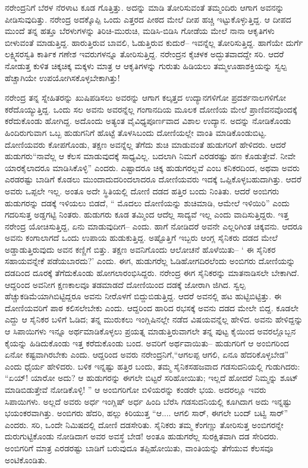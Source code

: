 ನರೇಂದ್ರನಿಗೆ ಬೆರಳ ನೆರಳಾಟ  ಕೂಡ ಗೊತ್ತಿತ್ತು. ಅದನ್ನು ಮಾಡಿ ತೋರಿಸುವಂತೆ ತಮ್ಮಂದಿರು ಆಗಾಗ ಅವನನ್ನು ಪೀಡಿಸುವುದಿತ್ತು. ನರೇಂದ್ರ ಅದಕ್ಕೊಪ್ಪಿ ಒಂದು ಎತ್ತರದ ಪೀಠದ ಮೇಲೆ ದೀಪ ಹಚ್ಚಿ ಇಟ್ಟುಕೊಳ್ಳುತ್ತಿದ್ದ. ಆ ದೀಪದ ಮುಂದೆ ತನ್ನ ಹತ್ತೂ ಬೆರಳುಗಳನ್ನು ತಿರಿಚಿ-ಮುರುಚಿ, ಮಡಿಸಿ-ಬಿಡಿಸಿ ಗೋಡೆಯ ಮೇಲೆ ನಾನಾ ಆಕೃತಿಗಳು ಬೀಳುವಂತೆ ಮಾಡುತ್ತಿದ್ದ. ಹಾರುತ್ತಿರುವ ಬಾವಲಿ, ಓಡುತ್ತಿರುವ ಕುದುರೆ– ಇವನ್ನೆಲ್ಲ ತೋರಿಸುತ್ತಿದ್ದ. ಹಾಗೆಯೇ ದುರ್ಗೆ ಲಕ್ಷ್ಮಿಸರಸ್ವತಿ ಕಾರ್ತಿಕ ಗಣೇಶ ಇವರುಗಳನ್ನೂ ತೋರಿಸುತ್ತಿದ್ದ. ನರೇಂದ್ರನ ಕೈಚಳಕ ಅದ್ಭುತವಾದದ್ದೇ ಸರಿ. ಆದರೆ ನೋಡುತ್ತ ಕುಳಿತ ಚಿಕ್ಕಚಿಕ್ಕ ಮಕ್ಕಳು ಮಾತ್ರ ಆ ಆಕೃತಿಗಳನ್ನು ಗುರುತು ಹಿಡಿಯಲು ತಮ್ಮಊಹಾಶಕ್ತಿಯನ್ನು ಸ್ವಲ್ಪ ಹೆಚ್ಚಾಗಿಯೇ ಉಪಯೋಗಿಸಕೊಳ್ಳಬೇಕಾಗಿತ್ತು!

ನರೇಂದ್ರ ತನ್ನ ಸ್ನೇಹಿತರನ್ನು ಖುಷಿಪಡಿಸಲು ಅವರನ್ನು ಆಗಾಗ ಕಲ್ಕತ್ತದ ಉದ್ಯಾನಗಳಿಗೋ ಪ್ರದರ್ಶನಾಲಗಳಿಗೋ ಕರೆದೊಯ್ಯುತ್ತಿದ್ದ. ಒಂದು ಸಲ ಅವನು ಅವರನ್ನೆಲ್ಲ ಗಂಗಾನದಿಯ ಮೂಲಕ ದೋಣಿಯ ಮೇಲೆ ಪ್ರಾಣಿವನವೊಂದಕ್ಕೆ ಕರೆದುಕೊಂಡು ಹೋಗಿದ್ದ. ಅದೊಂದು ಅತ್ಯಂತ ವೈವಿಧ್ಯಪೂರ್ಣವಾದ ವಿಶಾಲ ಉದ್ಯಾನ. ಅದನ್ನು ನೋಡಿಕೊಂಡು ಹಿಂದಿರುಗುವಾಗ ಒಬ್ಬ ಹುಡುಗನಿಗೆ ಹೊಟ್ಟೆ ತೊಳಸಿಬಂದು ದೋಣಿಯಲ್ಲೇ ವಾಂತಿ ಮಾಡಿಕೊಂಡುಬಿಟ್ಟ. ದೋಣಿಯವರು ಕೋಪಗೊಂಡು, ತಕ್ಷಣ ಅವನ್ನೆಲ್ಲ ತೆಗೆದು ಶುಚಿ ಮಾಡುವಂತೆ ಹುಡುಗರಿಗೆ ಹೇಳಿದರು. ಆದರೆ ಹುಡುಗರು“ನಾವೆಲ್ಲ ಆ ಕೆಲಸ ಮಾಡುವುದಕ್ಕೆ ಸಾಧ್ಯವಿಲ್ಲ. ಬದಲಾಗಿ ನಿಮಗೆ ಎರಡರಷ್ಟು ಹಣ ಕೊಡುತ್ತೇವೆ. ನೀವೇ ಯಾರಕೈಲಾದರೂ ಮಾಡಿಸಿಕೊಳ್ಳಿ” ಎಂದರು. ಎಷ್ಟಾದರೂ ಚಿಕ್ಕ ಹುಡುಗರಲ್ಲವೆ ಎಂಬ ಕನಿಕರದಿಂದ, ಅಥವಾ ಅವರು ಎರಡರಷ್ಟು ಬಾಡಿಗೆ ಕೊಡಲು ಮುಂದಾದುದರಿಂದಲಾದರೂ ದೋಣಿಯವರು ಇದಕ್ಕೆ ಒಪ್ಪಿಕೊಳ್ಳಬಹುದಾಗಿತ್ತು. ಆದರೆ ಅವರು ಒಪ್ಪಲೇ ಇಲ್ಲ. ಅಂತೂ ಅದೇ ಸ್ಥಿತಿಯಲ್ಲಿ ದೋಣಿ ದಡದ ಹತ್ತಿರ ಬಂದು ನಿಂತಿತು. ಆದರೆ ಅಂಬಿಗರು ಹುಡುಗರನ್ನು ದಡಕ್ಕೆ ಇಳಿಯಲು ಬಿಡದೆ, “ ಮೊದಲು ದೋಣಿಯನ್ನು ಶುಚಿಮಾಡಿ, ಆಮೇಲೆ ಇಳಿಯಿರಿ” ಎಂದು ಗದರಿಸುತ್ತ ಅಡ್ಡಗಟ್ಟಿ ನಿಂತರು. ಹುಡುಗರು ಕೂಡ ತಮ್ಮಿಂದ ಆದೆಲ್ಲ ಸಾದ್ಯವೆ ಇಲ್ಲ ಎಂದು ವಾದಿಸುತ್ತಿದ್ದರು. ಇತ್ತ ನರೇಂದ್ರ ಯೋಚಿಸುತ್ತಿದ್ದ, ಏನು ಮಾಡುವುದೀಗ– ಎಂದು. ಹಾಗೆ ನೋಡಿದರೆ ಅವನೇ ಎಲ್ಲರಿಗಿಂತ ಚಿಕ್ಕವನು. ಆದರೂ ಅವನು ಕಂಗಾಲಾಗದೆ ಒಂದು ಉಪಾಯ ಹುಡುಕುತ್ತಿದ್ದ. ಅಷ್ಟೊತ್ತಿಗೆ ಇಬ್ಬರು ಆಂಗ್ಲ ಸೈನಿಕರು ದಡದ ಮೇಲೆ ಅಡ್ಡಾಡುತ್ತಿರುವುದು ಅವನ ಕಣ್ಣಿಗೆ ಬಿತ್ತು. ತಕ್ಷಣ ಅವನಿಗೊಂದು ಆಲೋಚನೆ ಹೊಳೆಯಿತು– ‘ ಈ ಸೈನಿಕರ ಸಹಾಯವನ್ನೇಕೆ ಪಡೆಯಬಾರದು?’ ಎಂದು. ಈಗ, ಹುಡುಗರೆಲ್ಲ ಓಡಿಹೋಗದಿರಲೆಂದು ಅಂಬಿಗರು ದೋಣಿಯನ್ನು ದಡದಿಂದ ದೂರಕ್ಕೆ ತೆಗೆದುಕೊಂಡು ಹೋಗಲಾರಂಭಿಸಿದ್ದರು. ನರೇಂದ್ರ ಈಗ ಸೈನಿಕರನ್ನು ಮಾತನಾಡಿಸಲೇ ಬೇಕಾಗಿದೆ. ಆದ್ದರಿಂದ ಅವನೀಗ ಕ್ಷಣಕಾಲವೂ ತಡಮಾಡದೆ ದೋಣಿಯಿಂದ ದಡಕ್ಕೆ ಜೋರಾಗಿ ಜಿಗಿದ. ಸ್ವಲ್ಪ ಹೆಚ್ಚುಕಡಿಮೆಯಾಗಿಬಿಟ್ಟಿದ್ದರೂ ಅವನು ನೀರೊಳಗೆ ಬಿದ್ದುಬಿಡುತ್ತಿದ್ದ. ಆದರೆ ಅವನಲ್ಲಿ ಹಟ ಹುಟ್ಟಿಬಿಟ್ಟಿತ್ತು. ಈ ದೋಣಿಯವರಿಗೆ ಪಾಠ ಕಲಿಸಲೇಬೇಕು ಎಂದು. ಆದ್ದರಿಂದ ಹಾರಿದ ರಭಸಕ್ಕೆ ಅವನು ದಡದ ಮೇಲೇ ಬಿದ್ದ. ಕೂಡಲೇ ಎದ್ದು ಆ ಸೈನಿಕರ ಬಳಿಗೆ ಓಡಿದ; ತನ್ನ ಮುರುಕಲು ಇಂಗ್ಲಿಷಿನಲ್ಲೇ ನಡೆದ ವಿಷಯವನ್ನೆಲ್ಲ ಹೇಳಿದ. ಅವನು ಹೇಳಿದ್ದನ್ನು ಆ ಸಿಪಾಯಿಗಳು ಇನ್ನೂ ಅರ್ಥಮಾಡಿಕೊಳ್ಳಲು ಪ್ರಯತ್ನ ಮಾಡುತ್ತಿರುವಾಗಲೇ ತನ್ನ ಪುಟ್ಟ ಕೈಯಿಂದ ಅವರಲ್ಲೊಬ್ಬನ ಕೈಯನ್ನು ಹಿಡಿದುಕೊಂಡು ಇತ್ತ ಕರೆದುಕೊಂಡು ಬಂದ. ಅವರಿಗೆ ಅರ್ಥವಾಯಿತು– ಹುಡುಗರಿಗೆ ಆ ಅಂಬಿಗರಿಂದ ಏನೋ ಕಷ್ಟವಾಗಿರಬೇಕು ಎಂದು. ಆದ್ದರಿಂದ ಅವರು ನರೇಂದ್ರನಿಗೆ,“ಆಗಲಪ್ಪ ಆಗಲಿ, ಏನೂ ಹೆದರಿಕೊಳ್ಳಬೇಡ” ಎಂದು ಧೈರ್ಯ ಹೇಳಿದರು. ಬಳಿಕ ಇನ್ನಷ್ಟು ಹತ್ತಿರ ಬಂದು, ತಮ್ಮ ಸೈನಿಕಸಹಜವಾದ ಗಡಸುದನಿಯಲ್ಲಿ ಗುಡುಗಿದರು: “ಏಯ್! ಯಾರೋ ಅದು? ಆ ಹುಡುಗರನ್ನು ಈಗಲೇ ಬಿಟ್ಟರೆ ಸರಿಹೋಯಿತು; ಇಲ್ಲದೆ ಹೋದರೆ ನಿಮ್ಮನ್ನು ಶೂಟ್ ಮಾಡಿಬಿಡುತ್ತೇವೆ ನೋಡಿಕೊಳ್ಳಿ! ” ಆ ಅಂಬಿಗರಿಗೋ ಬಿಳಿಯರನ್ನು ಕಂಡರೇ ಭಯ. ಅದರಲ್ಲೂ ಇವರು ಸಿಪಾಯಿಗಳು. ಅಲ್ಲದೆ ಅವರು ಅರ್ಧ ಇಂಗ್ಲಿಷ್ ಅರ್ಧ ಹಿಂದಿ ಬೆರೆಸಿ ಗಡಸುದನಿಯಲ್ಲಿ ಕೂಗಿದಾಗ ಅದು ಇನ್ನಷ್ಟು ಭಯಂಕರವಾಗಿತ್ತು. ಅಂಬಿಗರು ಹೆದರಿ, ಹಲ್ಲು ಕಿರಿಯುತ್ತ “ಆ.... ಆಗಲಿ ಸಾರ್, ಈಗಲೇ ಬಂದ್ ಬಟ್ವಿ ಸಾರ್” ಎಂದರು. ಸರಿ, ಒಂದೇ ನಿಮಿಷದಲ್ಲಿ ದೋಣಿ ದಡಸೇರಿತು. ಸೈನಿಕರು ತಮ್ಮ ಕೆಂಗಣ್ಣು ತೋರಿಸುತ್ತ ಅಂಬಿಗರನ್ನೇ ದುರುಗುಟ್ಟಿಕೊಂಡು ನೋಡಿದಾಗ ಅವರ ಅವಸ್ಥೆ ಬೇಡ! ಅಂತೂ ಹುಡುಗರೆಲ್ಲ ಸುರಕ್ಷಿತವಾಗಿ ದಡ ಸೇರಿದರು. ಅಂಬಿಗರಿಗೆ ಮಾತ್ರ ಎರಡರಷ್ಟು ಬಾಡಿಗೆ ಬರುವುದೂ ತಪ್ಪಿಹೋಯಿತು, ವಾಂತಿಯನ್ನು ತೆಗೆಯುವ ಕೆಲಸವೂ ಅಂಟಿಕೊಂಡಿತು.

